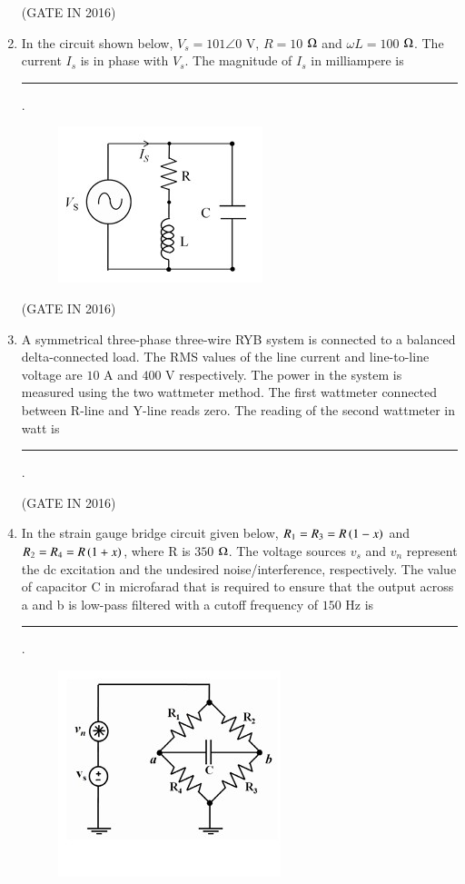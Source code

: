 \documentclass[journal,12pt,onecolumn]{IEEEtran}
\theoremstyle{remark}
\begin{document}
\begin{enumerate}
\hfill{(GATE IN 2016)}

\item In the circuit shown below, $V_s = 101\angle 0$ V, $R = 10$ $\ohm$ and $\omega L= 100$ $\ohm$. The current $I_s$ is in phase with $V_s$. The magnitude of $I_s$ in milliampere is \rule{2cm}{0.4pt}.
\begin{figure}[H]
\centering
\includegraphics[width=0.4\columnwidth]{figs/z13.jpg}
\caption*{}
\label{fig:z13}
\end{figure}

\hfill{(GATE IN 2016)}

\item A symmetrical three-phase three-wire RYB system is connected to a balanced delta-connected load. The RMS values of the line current and line-to-line voltage are $10$ A and $400$ V respectively. The power in the system is measured using the two wattmeter method. The first wattmeter connected between R-line and Y-line reads zero. The reading of the second wattmeter  in watt is \rule{2cm}{0.4pt}.

\hfill{(GATE IN 2016)}

\item In the strain gauge bridge circuit given below, $R_1 = R_3 = R \left(1 - x\right)$ and $R_2 = R_4 = R \left(1 + x\right)$, where R is $350$ $\ohm$. The voltage sources $v_s$ and $v_n$ represent the dc excitation and the undesired noise/interference, respectively. The value of capacitor C in microfarad that is required to ensure that the output across a and b is low-pass filtered with a cutoff frequency of $150$ Hz is \rule{2cm}{0.4pt}.
\begin{figure}[H]
\centering
\includegraphics[width=0.5\columnwidth]{figs/z14.jpg}
\caption*{}
\label{fig:z14}
\end{figure}


\end{enumerate}
\end{document}
